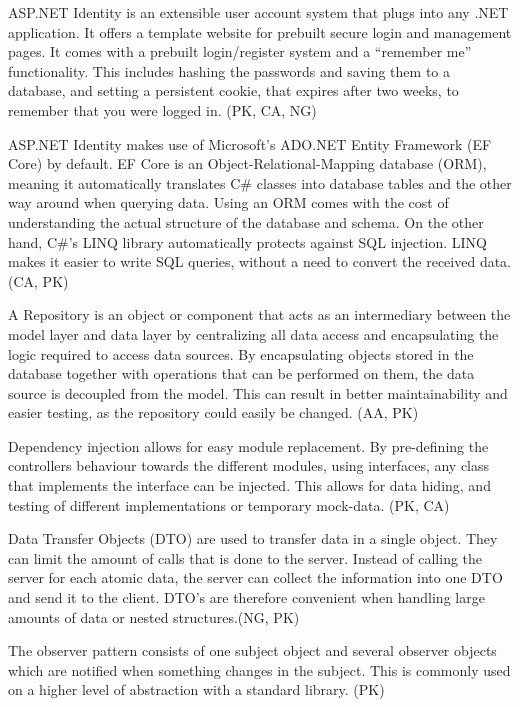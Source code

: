 \documentclass[acmlarge, review=false, screen=true]{acmart}
\begin{document}
ASP.NET Identity is an extensible user account system that plugs into any .NET application\cite{aspnet-identity}. It offers a template website for prebuilt secure login and management pages. It comes with a prebuilt login/register system and a “remember me” functionality. This includes hashing the passwords and saving them to a database, and setting a persistent cookie, that expires after two weeks, to remember that you were logged in. (PK, CA, NG)

ASP.NET Identity makes use of Microsoft’s ADO.NET Entity Framework (EF Core) by default\cite{adodotnet}. EF Core is an Object-Relational-Mapping database (ORM), meaning it automatically translates C\# classes into database tables and the other way around when querying data. Using an ORM comes with the cost of understanding the actual structure of the database and schema\cite{orm}. On the other hand, C\#’s LINQ library automatically protects against SQL injection\cite{ef-linq}. LINQ makes it easier to write SQL queries, without a need to convert the received data. (CA, PK)

A Repository is an object or component that acts as an intermediary between the model layer and data layer by centralizing all data access and encapsulating the logic required to access data sources\cite{Repository-pattern}. By encapsulating objects stored in the database together with operations that can be performed on them, the data source is decoupled from the model. This can result in better maintainability and easier testing, as the repository could easily be changed. (AA, PK)

Dependency injection allows for easy module replacement\cite{dependency-injection}. By pre-defining the controllers behaviour towards the different modules, using interfaces, any class that implements the interface can be injected. This allows for data hiding, and testing of different implementations or temporary mock-data. (PK, CA)

Data Transfer Objects (DTO) are used to transfer data in a single object. They can limit the amount of calls that is done to the server\cite{DTOs}. Instead of calling the server for each atomic data, the server can collect the information into one DTO and send it to the client. DTO’s are therefore convenient when handling large amounts of data or nested structures.(NG, PK)

The observer pattern consists of one subject object and several observer objects which are notified when something changes in the subject\cite{Design-patterns}. This is commonly used on a higher level of abstraction with a standard library. (PK)
\end{document}
